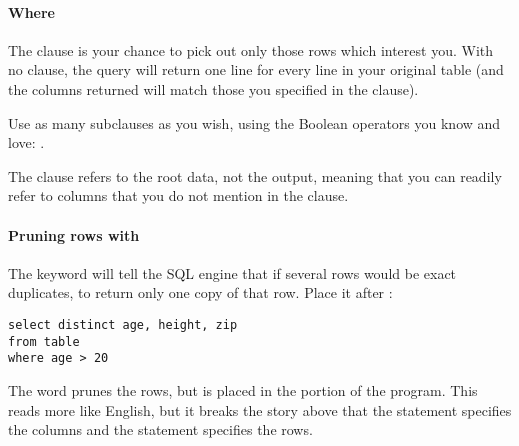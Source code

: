\paragraph{Where}
The  clause is your chance to pick out only those rows which
interest you. With no  clause, the query will return one line
for every line in your original table (and the columns returned will
match those you specified in the  clause).

Use as many subclauses as you wish, using the Boolean operators you
know and love: .

The  clause refers to the root data, not the output,
meaning that you can readily refer to columns that you do not mention
in the  clause.

\paragraph{Pruning rows with } The 
keyword will tell the SQL engine that if several rows would be exact
duplicates, to return only one copy of that row. Place it after 
: 
\begin{lstlisting}
select distinct age, height, zip
from table
where age > 20
\end{lstlisting}
The   word prunes the rows, but is placed in the 
 portion of the program.  This reads more like English, but it
breaks the story above that the  statement specifies the
columns and the  statement specifies the rows.


